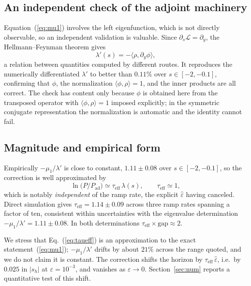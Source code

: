 \documentclass[%
 twocolumn,
 superscriptaddress,
 amsmath,amssymb,
 aps,
 pre,
 floatfix,
]{revtex4-2}
\newcommand{\Leff}{\mathcal{L}}
\newcommand{\Sig}{\hat\varepsilon}
\begin{document}
\subsection{An independent check of the adjoint machinery}

Equation~(\ref{eq:mu1}) involves the left eigenfunction, which is not directly observable, so an independent validation is valuable.  Since $\partial_s\Leff=\partial_y$, the Hellmann--Feynman theorem gives
\begin{equation}
\label{eq:hf}
\lambda'(s)=-\langle\rho,\partial_y\phi\rangle,
\end{equation}
a relation between quantities computed by different routes.  It reproduces the numerically differentiated $\lambda'$ to better than $0.11\%$ over $s\in[-2,-0.1]$, confirming that $\phi$, the normalization $\langle\phi,\rho\rangle=1$, and the inner products are all correct.  The check has content only because $\phi$ is obtained here from the transposed operator with $\langle\phi,\rho\rangle=1$ imposed explicitly; in the symmetric conjugate representation the normalization is automatic and the identity cannot fail.

\subsection{Magnitude and empirical form}

Empirically $-\mu_1/\lambda'$ is close to constant, $1.11\pm0.08$ over $s\in[-2,-0.1]$, so the correction is well approximated by
\begin{equation}
\label{eq:taueff}
\ln\bigl(P/P_{\mathrm{ad}}\bigr)\simeq\tau_{\mathrm{eff}}\,\lambda(s),\qquad \tau_{\mathrm{eff}}\simeq1,
\end{equation}
which is notably \emph{independent} of the ramp rate, the explicit $\Sig$ having canceled.  Direct simulation gives $\tau_{\mathrm{eff}}=1.14\pm0.09$ across three ramp rates spanning a factor of ten, consistent within uncertainties with the eigenvalue determination $-\mu_1/\lambda'=1.11\pm0.08$.  In both determinations $\tau_{\mathrm{eff}}\times\text{gap}\approx2$.

We stress that Eq.~(\ref{eq:taueff}) is an approximation to the exact statement~(\ref{eq:mu1}); $-\mu_1/\lambda'$ drifts by about $21\%$ across the range quoted, and we do not claim it is constant.  The correction shifts the horizon by $\tau_{\mathrm{eff}}\,\Sig$, i.e.\ by $0.025$ in $|s_h|$ at $\varepsilon=10^{-3}$, and vanishes as $\varepsilon\to0$.  Section~\ref{sec:num} reports a quantitative test of this shift.
\end{document}
